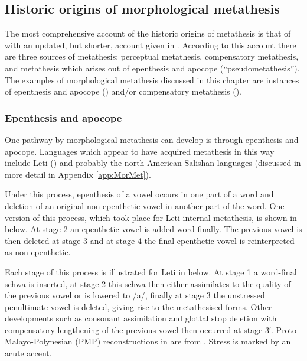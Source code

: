 \subsection{Historic origins of morphological metathesis}\label{sec:OriMorMet}
The most comprehensive account of the historic origins of metathesis
is that of \cite{blga98} with an updated, but shorter, account given in \cite{blga04}.
According to this account there are three sources of metathesis:
perceptual metathesis, compensatory metathesis, and metathesis which arises
out of epenthesis and apocope (``pseudometathesis'').
The examples of morphological metathesis discussed
in this chapter are instances of epenthesis and apocope ()
and/or compensatory metathesis ().

\subsubsection{Epenthesis and apocope}\label{sec:EpeApo}
One pathway by morphological metathesis can develop
is through epenthesis and apocope.
Languages which appear to have acquired metathesis in this way include Leti ()
and probably the north American Salishan languages
(discussed in more detail in Appendix \ref{app:MorMet}).

Under this process, epenthesis of a vowel occurs in one part of a word
and deletion of an original non-epenthetic vowel in another part of the word.
One version of this process, which took place for Leti internal metathesis,
is shown in  below.
At stage 2 an epenthetic vowel is added word finally.
The previous vowel is then deleted at stage 3 and at stage 4
the final epenthetic vowel is reinterpreted as non-epenthetic.

\begin{exe}\let\eachwordone=\textnormal
	\label{ex:EpeApo}
\end{exe}

Each stage of this process is illustrated
for Leti in  below.
At stage 1 a word-final schwa is inserted,
at stage 2 this schwa then either assimilates
to the quality of the previous vowel or is lowered to /a/,
finally at stage 3 the unstressed penultimate vowel is deleted,
giving rise to the metathesised forms.
Other developments such as consonant assimilation and glottal stop
deletion with compensatory lengthening of the previous vowel
then occurred at stage 3′.
Proto-Malayo-Polynesian (PMP) reconstructions in  are from \cite{bltr}.
Stress is marked by an acute accent.

